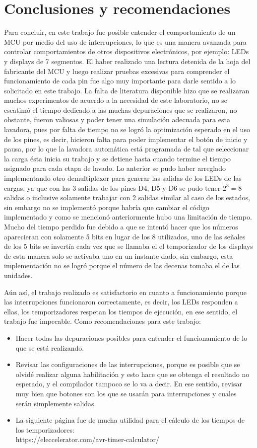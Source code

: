 \section{Conclusiones y recomendaciones}
Para concluir, en este trabajo fue posible entender el comportamiento de un MCU por medio del uso de interrupciones, lo que es una manera avanzada para controlar comportamientos de otros dispositivos electrónicos, por ejemplo: LEDs y displays de 7 segmentos. El haber realizado una lectura detenida de la hoja del fabricante del MCU y luego realizar pruebas excesivas para comprender el funcionamiento de cada pin fue algo muy importante para darle sentido a lo solicitado en este trabajo. La falta de literatura disponible hizo que se realizaran muchos experimentos de acuerdo a la necesidad de este laboratorio, no se escatimó el tiempo dedicado a las muchas depuraciones que se realizaron, no obstante, fueron valiosas y poder tener una simulación adecuada para esta lavadora, pues por falta de tiempo no se logró la optimización esperado en el uso de los pines, es decir, hicieron falta para poder implementar el botón de inicio y pausa, por lo que la lavadora automática está programada de tal que seleccionar la carga ésta inicia su trabajo y se detiene hasta cuando termine el tiempo asignado para cada etapa de lavado. Lo anterior se pudo haber arreglado implementando otro demultiplexor para generar las salidas de los LEDs de las cargas, ya que con las 3 salidas de los pines D4, D5 y D6 se pudo tener $2^3 = 8$ salidas o inclusive solamente trabajar con 2 salidas similar al caso de los estados, sin embargo no se implementó porque habría que cambiar el código implementado y como se mencionó anteriormente hubo una limitación de tiempo. Mucho del tiempo perdido fue debido a que se intentó hacer que los números aparecieran con solamente 5 bits en lugar de los 8 utilizados, uno de las señales de los 5 bits se invertía cada vez que se llamaba el el temporizador de los displays de esta manera solo se activaba uno en un instante dado, sin embargo, esta implementación no se logró porque el número de las decenas tomaba el de las unidades. \par
Aún así, el trabajo realizado es satisfactorio en cuanto a funcionamiento porque las interrupciones funcionaron correctamente, es decir, los LEDs responden a ellas, los temporizadores respetan los tiempos de ejecución, en ese sentido, el trabajo fue impecable. 
Como recomendaciones para este trabajo:
\begin{itemize}
\item Hacer todas las depuraciones posibles para entender el funcionamiento de lo que se está realizando.
\item Revisar las configuraciones de las interrupciones, porque es posible que se olvidé realizar alguna habilitación y esto hace que se obtenga el resultado no esperado, y el compilador tampoco se lo va a decir. En ese sentido, revisar muy bien que botones son los que se usarán para interrupciones y cuales serán simplemente salidas.
\item La siguiente página fue de mucha utilidad para el cálculo de los tiempos de los temporizadores:\\
https://eleccelerator.com/avr-timer-calculator/
\end{itemize}
